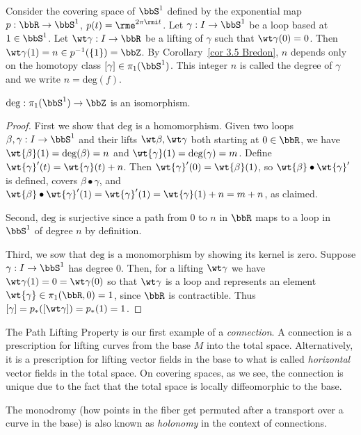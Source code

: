 \begin{defn}
    Consider the covering space of $\bbS^1$ defined by the exponential map $p:\bbR \to \bbS^1$, $p(t)=\rme^{2\pi\rmi t}$. Let $\gamma :I\to \bbS^1$ be a loop based at $1\in \bbS^1$. Let $\wt\gamma :I\to \bbR $ be a lifting of $\gamma$ such that $\wt\gamma(0)=0$. Then $\wt\gamma(1)=n\in p^{-1}(\{1\})=\bbZ$. By Corollary~\ref{cor 3.5 Bredon}, $n$ depends only on the homotopy class $[\gamma]\in\pi_1(\bbS^1)$. This integer $n$ is called the degree of $\gamma$ and we write $n=\mathrm{deg}(f)$.
\end{defn}
\begin{thm}\label{pi_1 of the circle thm}
    $\mathrm{deg}: \pi_1(\bbS^1)\to \bbZ$ is an isomorphism.
\end{thm}
\begin{proof}
    First we show that $\mathrm{deg}$ is a homomorphism. Given two loops $\beta,\gamma:I\to \bbS^1$ and their lifts $\wt \beta,\wt\gamma$ both starting at $0\in\bbR $, we have $\wt{\beta}(1)=\mathrm{deg}(\beta)=n$ and  $\wt{\gamma}(1)=\mathrm{deg}(\gamma)=m$. Define $\wt{\gamma}'(t)=\wt{\gamma}(t)+n$. Then $\wt{\gamma}'(0)=\wt{\beta}(1)$, so $\wt{\beta}\bullet \wt{\gamma}'$ is defined, covers $\beta\bullet\gamma$, and $\wt{\beta}\bullet \wt{\gamma}'(1)=\wt{\gamma}'(1)=\wt{\gamma}(1)+n=m+n$, as claimed.

    Second, $\mathrm{deg}$ is surjective since a path from $0$ to $n$ in $\bbR $ maps to a loop in $\bbS^1$ of degree $n$ by definition.

    Third, we sow that $\mathrm{deg}$ is a monomorphism by showing its kernel is zero. Suppose $\gamma:I\to \bbS^1$ has degree $0$. Then, for a lifting $\wt\gamma$ we have $\wt\gamma(1)=0=\wt\gamma(0)$ so that $\wt\gamma$ is a loop and represents an element $\wt{\gamma}\in\pi_1(\bbR ,0)=1$, since $\bbR $ is contractible. Thus $[\gamma]=p_\ast([\wt\gamma])=p_\ast (1)=1$.
\end{proof}


\begin{rem}\label{covering spaces and connections}
	The Path Lifting Property is our first example of a \emph{connection}. A connection is a prescription for lifting curves from the base $M$ into the total space. Alternatively, it is a prescription for lifting vector fields in the base to what is called \emph{horizontal} vector fields in the total space. On covering spaces, as we see, the connection is unique due to the fact that the total space is locally diffeomorphic to the base.
	
	The monodromy (how points in the fiber get permuted after a transport over a curve in the base) is also known as \emph{holonomy} in the context of connections.
\end{rem}

